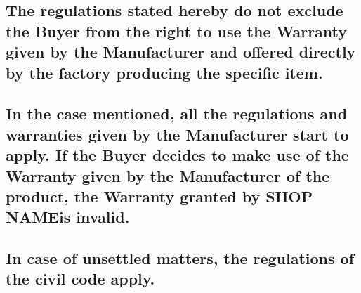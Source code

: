 \documentclass[10pt,a4paper]{article}
\newcommand{\shopname}{SHOP NAME}
\begin{document}
\subsection{The regulations stated hereby do not exclude the Buyer from the right to use the Warranty given by the  Manufacturer and offered directly by the factory producing the specific item.}

\subsection{In the case mentioned, all the regulations and warranties given by the Manufacturer start to apply. If the Buyer decides to make use of the Warranty given by the Manufacturer of the product,  the Warranty granted by \shopname is invalid.}

\subsection{In case of unsettled matters, the regulations of the civil code apply.}
\end{document}

